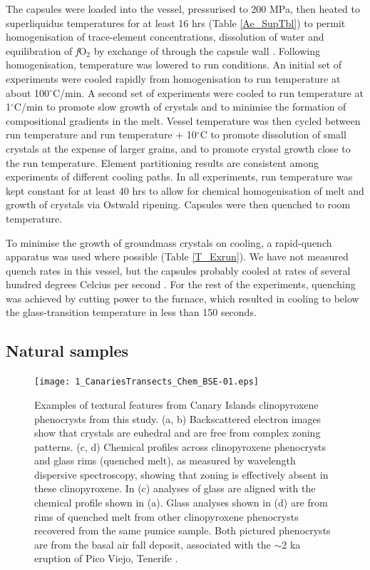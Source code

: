 \documentclass[review,authoryear,12pt]{elsarticle}
\newcommand{\dgC}{$^\circ$C }
\newcommand{\dgCs}{$^\circ$C}
\newcommand{\fO}{\textit{f}O$_{2}$ }
\begin{document}
The capsules were loaded into the vessel, pressurised to 200 MPa, then heated to superliquidus temperatures for at least 16 hrs (Table \ref{Ae_SupTbl}) to permit homogenisation of trace-element concentrations, dissolution of water and equilibration of \fO by exchange of  through the capsule wall \citep[cf.][]{Gaillard2002}. Following homogenisation, temperature was lowered to run conditions. An initial set of experiments were cooled rapidly from homogenisation to run temperature at about 100\dgCs/min. A second set of experiments were cooled to run temperature at 1\dgCs/min to promote slow growth of crystals and to minimise the formation of compositional gradients in the melt. Vessel temperature was then cycled between run temperature and run temperature + 10\dgC to promote dissolution of small crystals at the expense of larger grains, and to promote crystal growth close to the run temperature. Element partitioning results are consistent among experiments of different cooling paths.
In all experiments, run temperature was kept constant for at least 40 hrs to allow for chemical homogenisation of melt and growth of crystals via Ostwald ripening. Capsules were then quenched to room temperature.

To minimise the growth of groundmass crystals on cooling, a rapid-quench apparatus was used where possible (Table \ref{T_Exrun}). We have not measured quench rates in this vessel, but the capsules probably cooled at rates of several hundred degrees Celcius per second \citep[e.g.][]{Berndt2002}. For the rest of the experiments, quenching was achieved by cutting power to the furnace, which resulted in cooling to below the glass-transition temperature \citep[$<350$\dgCs;][]{Giordano2005} in less than 150 seconds.

\subsection{Natural samples}

         \begin{figure}[ht]
        \begin{center}
        \texttt{[image: 1\_CanariesTransects\_Chem\_BSE-01.eps]}
		\caption[Examples of textural features from Canary Islands clinopyroxene phenocrysts from this study, with chemical transects]{Examples of textural features from Canary Islands clinopyroxene phenocrysts from this study. (a, b) Backscattered electron images show that crystals are euhedral and are free from complex zoning patterns. (c, d) Chemical profiles across clinopyroxene phenocrysts and glass rims (quenched melt), as measured by wavelength dispersive spectroscopy, showing that zoning is effectively absent in these clinopyroxene. In (c) analyses of glass are aligned with the chemical profile shown in (a). Glass analyses shown in (d) are from rims of quenched melt from other clinopyroxene phenocrysts recovered from the same pumice sample. Both pictured phenocrysts are from the basal air fall deposit, associated with the $\sim$2 ka eruption of Pico Viejo, Tenerife \citep{Ablay1995}.
        }
        \label{3_ChemTransect}
        \end{center}
        \end{figure}
\end{document}
